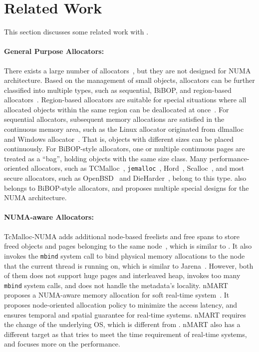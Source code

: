\section{Related Work}

\label{sec:related}

This section discusses some related work with \NM{}. 

\paragraph{General Purpose Allocators:}
 There exists a large number of allocators~\cite{dlmalloc,Hoard,tcmalloc,jemalloc,Scalloc}, but they are not designed for NUMA architecture. Based on the management of small objects, allocators can be further classified into multiple types, such as sequential, BiBOP, and region-based allocators~\cite{Gay:1998:MME:277650.277748,  DieHarder}. Region-based allocators are suitable for special situations where all allocated objects within the same region can be deallocated at once~\cite{Gay:1998:MME:277650.277748}. For sequential allocators, subsequent memory allocations are satisfied in the continuous memory area, such as the Linux allocator originated from dlmalloc~\cite{dlmalloc} and Windows allocator~\cite{DieHarder}. That is, objects with different sizes can be placed continuously. For BiBOP-style allocators, one or multiple continuous pages are treated as a ``bag'', holding objects with the same size class. Many performance-oriented allocators, such as TCMalloc~\cite{tcmalloc}, \texttt{jemalloc}~\cite{jemalloc}, Hord~\cite{Hoard}, Scalloc~\cite{Scalloc}, and most secure allocators, such as OpenBSD~\cite{OpenBSD} and DieHarder~\cite{DieHarder}, belong to this type.  \NM{} also belongs to BiBOP-style allocators, and proposes multiple special designs for the NUMA architecture. 

\paragraph{NUMA-aware Allocators:} TcMalloc-NUMA adds additional node-based freelists and free spans to store freed objects and pages belonging to the same node~\cite{tcmallocnew}, which is similar to \NM{}. It also invokes the \texttt{mbind} system call to bind physical memory allocations to the node that the current thread is running on, which is similar to Jarena~\cite{yang2019jarena}. However, both of them does not support huge pages and interleaved heap, invokes too many \texttt{mbind} system calls, and does not handle the metadata's locality. nMART proposes a NUMA-aware memory allocation for soft real-time system~\cite{kim2013node}. It proposes node-oriented allocation policy to minimize the access latency, and ensures temporal and spatial guarantee for real-time systems. nMART requires the change of the underlying OS, which is different from \NM{}. nMART also has a different target as \NM{} that tries to meet the time requirement of real-time systems, and \NM{} focuses more on the performance.


